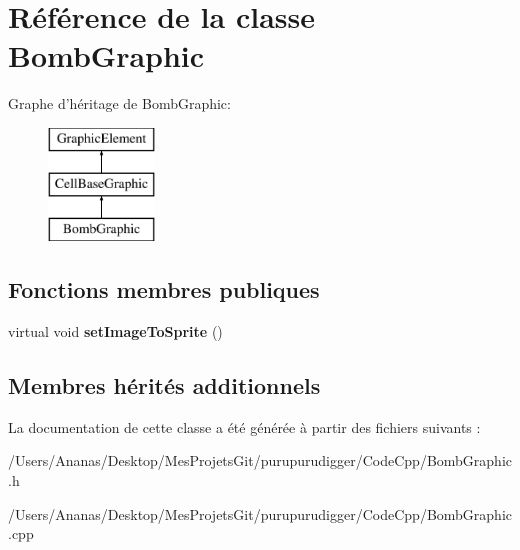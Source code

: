 \hypertarget{class_bomb_graphic}{\section{Référence de la classe Bomb\-Graphic}
\label{class_bomb_graphic}
}
Graphe d'héritage de Bomb\-Graphic\-:\begin{figure}[H]
\begin{center}
\leavevmode
\includegraphics[height=3.000000cm]{class_bomb_graphic}
\end{center}
\end{figure}
\subsection*{Fonctions membres publiques}
\begin{DoxyCompactItemize}
\item 
\hypertarget{class_bomb_graphic_a919767f2decd54bc8f6c75edfad8a3ef}{virtual void {\bfseries set\-Image\-To\-Sprite} ()}\label{class_bomb_graphic_a919767f2decd54bc8f6c75edfad8a3ef}

\end{DoxyCompactItemize}
\subsection*{Membres hérités additionnels}


La documentation de cette classe a été générée à partir des fichiers suivants \-:\begin{DoxyCompactItemize}
\item 
/\-Users/\-Ananas/\-Desktop/\-Mes\-Projets\-Git/purupurudigger/\-Code\-Cpp/Bomb\-Graphic.\-h\item 
/\-Users/\-Ananas/\-Desktop/\-Mes\-Projets\-Git/purupurudigger/\-Code\-Cpp/Bomb\-Graphic.\-cpp\end{DoxyCompactItemize}
